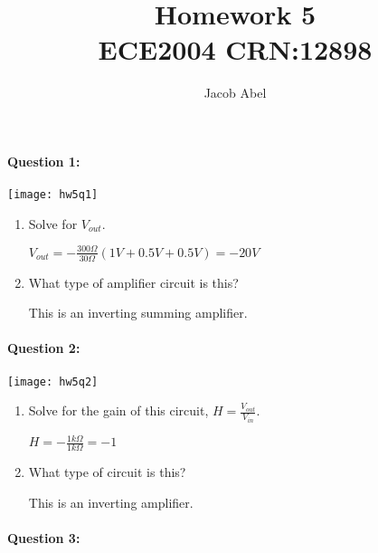 \documentclass[12pt,letterpaper,titlepage]{article}
\author{Jacob Abel}
\title{	Homework 5
	\\\large ECE2004 CRN:12898
}
\begin{document}
\maketitle
\begin{raggedright}

\paragraph{Question 1: }


\begin{center}
\texttt{[image: hw5q1]}
\end{center}

\begin{enumerate}[label=\Alph*)]
\item Solve for $V_{out}$.

$V_{out} = - \frac{300\Omega}{30\Omega}(1V+0.5V+0.5V)=-20V$

\item What type of amplifier circuit is this?

This is an inverting summing amplifier.

\end{enumerate}


\clearpage

\paragraph{Question 2: }

\begin{center}
\texttt{[image: hw5q2]}
\end{center}


\begin{enumerate}[label=\Alph*)]
\item Solve for the gain of this circuit, $H=\frac{V_{out}}{V_{in}}$.

$H = - \frac{1k\Omega}{1k\Omega} = -1$

\item What type of circuit is this?

This is an inverting amplifier.

\end{enumerate}

\clearpage

\paragraph{Question 3: }


\end{raggedright}
\end{document}
